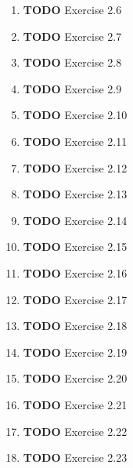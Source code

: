 \documentclass[11pt]{article}
\begin{document}
\begin{enumerate}
\begin{enumerate}
\item {\bfseries\sffamily TODO} Exercise 2.6
\label{sec:org6c8c48f}

\item {\bfseries\sffamily TODO} Exercise 2.7
\label{sec:org4e1aaa3}

\item {\bfseries\sffamily TODO} Exercise 2.8
\label{sec:org175ca82}

\item {\bfseries\sffamily TODO} Exercise 2.9
\label{sec:orgc7ad7f0}

\item {\bfseries\sffamily TODO} Exercise 2.10
\label{sec:org505be51}

\item {\bfseries\sffamily TODO} Exercise 2.11
\label{sec:org462122d}

\item {\bfseries\sffamily TODO} Exercise 2.12
\label{sec:orgb3e5fbc}

\item {\bfseries\sffamily TODO} Exercise 2.13
\label{sec:org5e05a59}

\item {\bfseries\sffamily TODO} Exercise 2.14
\label{sec:org42c7a29}

\item {\bfseries\sffamily TODO} Exercise 2.15
\label{sec:org154f988}

\item {\bfseries\sffamily TODO} Exercise 2.16
\label{sec:org1b2c429}

\item {\bfseries\sffamily TODO} Exercise 2.17
\label{sec:org4ebd177}

\item {\bfseries\sffamily TODO} Exercise 2.18
\label{sec:org0794699}

\item {\bfseries\sffamily TODO} Exercise 2.19
\label{sec:orgfb833e8}

\item {\bfseries\sffamily TODO} Exercise 2.20
\label{sec:org25ec3fb}

\item {\bfseries\sffamily TODO} Exercise 2.21
\label{sec:org4e35cc7}

\item {\bfseries\sffamily TODO} Exercise 2.22
\label{sec:org26fb382}

\item {\bfseries\sffamily TODO} Exercise 2.23
\label{sec:org04700e1}


\end{enumerate}
\end{enumerate}
\end{document}
